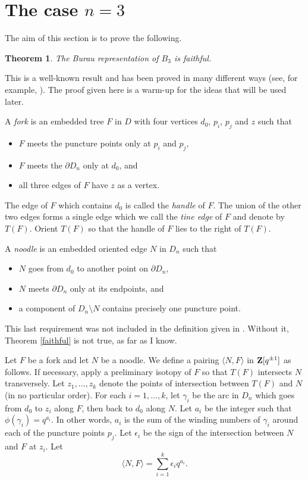 \documentclass[10pt]{amsart}
\theoremstyle{plain}
\newtheorem{thm}{Theorem}[section]
\theoremstyle{definition}
\newcommand{\Z}{{\bf{Z}}}
\begin{document}
\section{The case $n=3$}

The aim of this section is to prove the following.

\begin{thm}
\label{burau3}
The Burau representation of $B_3$ is faithful.
\end{thm}

This is a well-known result
and has been proved in many different ways
(see, for example, \cite{birman}).
The proof given here is a warm-up for the ideas that will be used later.

A {\em fork}
is an embedded tree $F$ in $D$
with four vertices $d_0$, $p_i$, $p_j$ and $z$
such that 
\begin{itemize}
\item $F$ meets the puncture points only at $p_i$ and $p_j$,
\item $F$ meets the $\partial D_n$ only at $d_0$, and
\item all three edges of $F$ have $z$ as a vertex.
\end{itemize}
The edge of $F$ which contains $d_0$ is called
the {\em handle} of $F$.
The union of the other two edges forms a single edge 
which we call the {\em tine edge} of $F$
and denote by $T(F)$.
Orient $T(F)$ so that the handle of $F$ lies to the right of $T(F)$.

A {\em noodle}
is an embedded oriented edge $N$ in $D_n$ such that
\begin{itemize}
\item $N$ goes from $d_0$ to another point on $\partial D_n$,
\item $N$ meets $\partial D_n$ only at its endpoints, and
\item a component of $D_n \setminus N$ contains precisely one puncture point.
\end{itemize}
This last requirement
was not included in the definition given in \cite{bigelow:bgal}.
Without it, Theorem \ref{faithful} is not true,
as far as I know.

Let $F$ be a fork and let $N$ be a noodle.
We define a pairing $\langle N,F \rangle$ in $\Z[q^{\pm 1}]$ as follows.
If necessary, apply a preliminary isotopy of $F$
so that $T(F)$ intersects $N$ transversely.
Let $z_1,\dots,z_k$ denote 
the points of intersection between $T(F)$ and $N$
(in no particular order).
For each $i=1,\dots,k$,
let $\gamma_i$ be the arc in $D_n$
which goes from $d_0$ to $z_i$ along $F$,
then back to $d_0$ along $N$.
Let $a_i$ be the integer such that $\phi(\gamma_i) = q^{a_i}$.
In other words, $a_i$ is the sum of
the winding numbers of $\gamma_i$
around each of the puncture points $p_j$.
Let $\epsilon_i$ be the sign of the intersection
between $N$ and $F$ at $z_i$.
Let
\begin{equation}
\label{pair1}
\langle N,F \rangle = \sum_{i=1}^k \epsilon_i q^{a_i}.
\end{equation}
\end{document}
